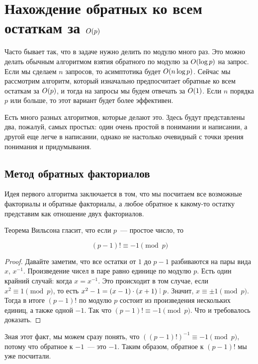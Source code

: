 \chapter{Нахождение обратных ко всем остаткам за $O(p)$}

Часто бывает так, что в задаче нужно делить по модулю много раз. Это можно делать обычным алгоритмом взятия обратного по модулю за $O(\log p)$ на запрос. Если мы сделаем $n$ запросов, то асимптотика будет $O(n \log p)$. Сейчас мы рассмотрим алгоритм, который изначально предпосчитает обратные ко всем остаткам за $O(p)$, и тогда на запросы мы будем отвечать за $O(1)$. Если $n$ порядка $p$ или больше, то этот вариант будет более эффективен.

Есть много разных алгоритмов, которые делают это. Здесь будут представлены два, пожалуй, самых простых: один очень простой в понимании и написании, а другой еще легче в написании, однако не настолько очевидный с точки зрения понимания и придумывания.

\section{Метод обратных факториалов}

Идея первого алгоритма заключается в том, что мы посчитаем все возможные факториалы и обратные факториалы, а любое обратное к какому-то остатку представим как отношение двух факториалов.

\begin{theorem}
    \label{Wilson}
    Теорема Вильсона гласит, что если $p$~--- простое число, то

    $$
    (p - 1)! \equiv -1 \pmod p
    $$
\end{theorem}

\begin{proof}
    Давайте заметим, что все остатки от $1$ до $p - 1$ разбиваются на пары вида $x$, $x^{-1}$. Произведение чисел в паре равно единице по модулю $p$.
    Есть один крайний случай: когда $x = x^{-1}$. Это происходит в том случае, если $x^2 \equiv 1 \pmod p$, то есть
    $x^2 - 1 = (x - 1) \cdot (x + 1) \divby p$. Значит, $x \equiv \pm 1 \pmod p$. Тогда в итоге $(p - 1)!$ по модулю $p$ состоит из произведения нескольких единиц, а также одной $-1$. Так что $(p - 1)! \equiv -1 \pmod p$. Что и требовалось доказать.
\end{proof}

Зная этот факт, мы можем сразу понять, что $\left((p - 1)!\right)^{-1} \equiv -1 \pmod p$, потому что обратное к $-1$~--- это $-1$. Таким образом, обратное к $(p - 1)!$ мы уже посчитали.


